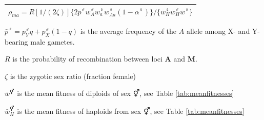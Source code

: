 \documentclass[12pt]{article}
\begin{document}
\begin{threeparttable}[ht]
\begin{tabular}{l}
  $\rho_{ma}=R [1/(2 \zeta)] \{ 2\bar{p}^{\male} w_{A}^{\male} w_{a}^{\female} w_{Aa}^{\female} (1-\alpha^{\female}) \}/ \{ \bar{w}_H^\female \bar{w}_H^\male \bar{w}^\female \} $\\ [1ex] 
  \hline \hline 
   \end{tabular}
      \begin{tablenotes}
      \scriptsize
      \item $\bar{p}^{\male}=p_{Y}^{\male}q+p_{X}^{\male}(1-q)$ is the average frequency of the $A$ allele among X- and Y-bearing male gametes.
      \item $R$ is the probability of recombination between loci \textbf{A} and \textbf{M}.
      \item $\zeta$ is the zygotic sex ratio (fraction female)
      \item $\bar{w}^\Hermaphrodite$ is the mean fitness of diploids of sex $\Hermaphrodite$, see Table \ref{tab:meanfitnesses}
      \item $\bar{w}_H^\Hermaphrodite$ is the mean fitness of haploids from sex $\Hermaphrodite$, see Table \ref{tab:meanfitnesses}
    \end{tablenotes}
  \label{tab:haplotype_growth}
\end{threeparttable}
\\
\end{document}
